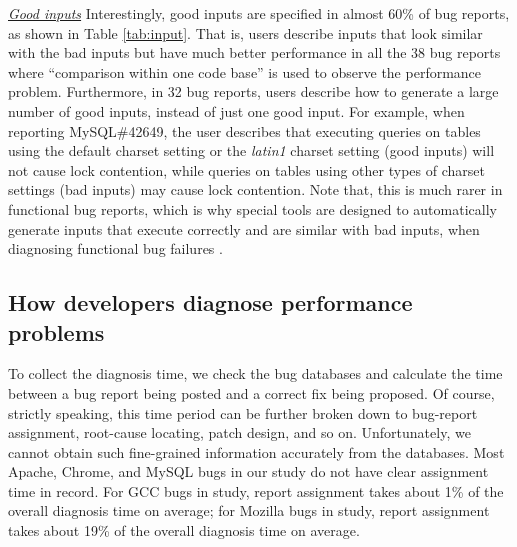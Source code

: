 \underline{\it Good inputs} Interestingly, good inputs are specified in almost
60\% of bug reports, as shown in Table \ref{tab:input}. 
That is, users describe inputs that look similar with the
bad inputs but have much better performance in all the 38 bug reports
where ``comparison within one code base'' is used to observe the performance
problem.
Furthermore,
in 32 bug reports, users describe how to generate a large number of good
inputs, instead of just one good input.
For example, when reporting MySQL\#42649, the user
describes that executing queries on tables using the default charset setting or
the \textit{latin1} charset setting (good inputs) will not cause lock contention, while queries
on tables using other types of charset settings (bad inputs) may cause lock contention.
Note that, this is much rarer in functional bug reports, which is why special
tools are
designed to automatically generate inputs that execute correctly
and are similar with bad inputs, when diagnosing functional bug failures
\cite{delta}.




\subsection{How developers diagnose performance problems}

To collect the diagnosis time, we check the bug databases and calculate the
time between a bug report being posted and a correct fix being proposed.
Of course, strictly speaking, this time period can be further broken down to
bug-report assignment, root-cause locating, patch design, and so on. 
Unfortunately, we cannot obtain such fine-grained information accurately
from the databases. Most Apache, Chrome, and MySQL bugs in
our study do not have clear assignment time in record. For GCC bugs in
study, report assignment takes about 1\% of the overall diagnosis
time on average; for Mozilla bugs in study, report assignment takes about
19\% of the overall diagnosis time on average.

